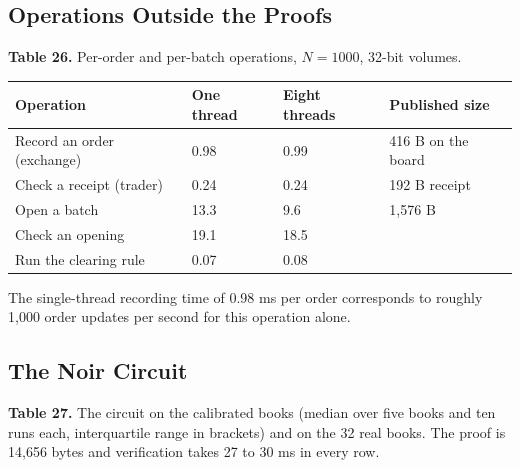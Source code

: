 \subsection{Operations Outside the Proofs}

\textbf{Table 26.} Per-order and per-batch operations, \(N = 1000\), 32-bit volumes.

\begin{longtable}[]{@{}llll@{}}
\toprule\noalign{}
Operation & One thread & Eight threads & Published size \\
\midrule\noalign{}
\endhead
\bottomrule\noalign{}
\endlastfoot
Record an order (exchange) & 0.98 & 0.99 & 416 B on the board \\
Check a receipt (trader) & 0.24 & 0.24 & 192 B receipt \\
Open a batch & 13.3 & 9.6 & 1,576 B \\
Check an opening & 19.1 & 18.5 & \\
Run the clearing rule & 0.07 & 0.08 & \\
\end{longtable}

The single-thread recording time of 0.98 ms per order corresponds to roughly 1,000 order updates per second for this operation alone.

\subsection{The Noir Circuit}

\textbf{Table 27.} The circuit on the calibrated books (median over five books and ten runs each, interquartile range in brackets) and on the 32 real books. The proof is 14,656 bytes and verification takes 27 to 30 ms in every row.

